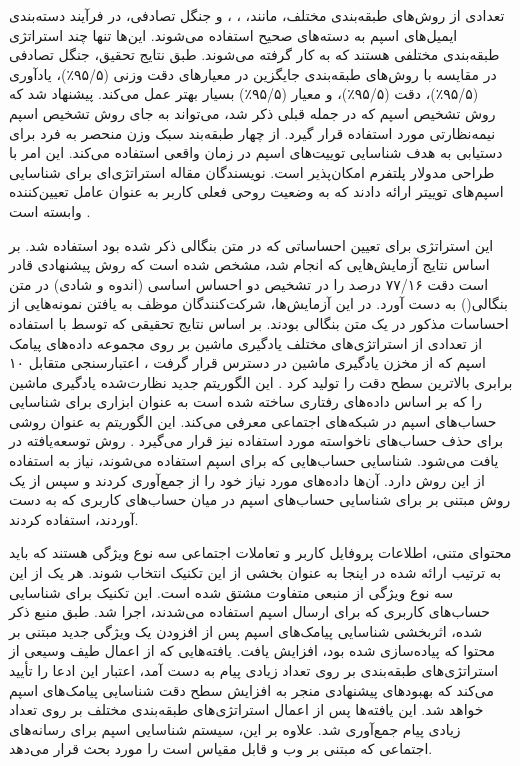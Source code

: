 \documentclass{CSICC2020}
\begin{document}
	تعدادی از روش‌های طبقه‌بندی مختلف، مانند، ، ، و جنگل تصادفی، در فرآیند دسته‌بندی ایمیل‌های اسپم به دسته‌های صحیح استفاده می‌شوند. این‌ها تنها چند استراتژی طبقه‌بندی مختلفی هستند که به کار گرفته می‌شوند. طبق نتایج تحقیق، جنگل تصادفی در مقایسه با روش‌های طبقه‌بندی جایگزین در معیارهای دقت وزنی (۹۵/۵٪)، یادآوری (۹۵/۵٪)، دقت (۹۵/۵٪)، و معیار (۹۵/۵٪) بسیار بهتر عمل می‌کند. پیشنهاد شد که روش تشخیص اسپم  که در جمله قبلی ذکر شد، می‌تواند به جای روش تشخیص اسپم نیمه‌نظارتی مورد استفاده قرار گیرد.  از چهار طبقه‌بند سبک وزن منحصر به فرد برای دستیابی به هدف شناسایی توییت‌های اسپم در زمان واقعی استفاده می‌کند. این امر با طراحی مدولار پلتفرم امکان‌پذیر است. نویسندگان مقاله استراتژی‌ای برای شناسایی اسپم‌های توییتر ارائه دادند که به وضعیت روحی فعلی کاربر به عنوان عامل تعیین‌کننده وابسته است \cite{islam2019using}.
	
	این استراتژی برای تعیین احساساتی که در متن بنگالی ذکر شده بود استفاده شد. بر اساس نتایج آزمایش‌هایی که انجام شد، مشخص شده است که روش پیشنهادی قادر است دقت ۷۷/۱۶ درصد را در تشخیص دو احساس اساسی (اندوه و شادی) در متن بنگالی() به دست آورد. در این آزمایش‌ها، شرکت‌کنندگان موظف به یافتن نمونه‌هایی از احساسات مذکور در یک متن بنگالی بودند. بر اساس نتایج تحقیقی که توسط با استفاده از تعدادی از استراتژی‌های مختلف یادگیری ماشین بر روی مجموعه داده‌های پیامک اسپم که از مخزن یادگیری ماشین  در دسترس قرار گرفت \cite{sayamber2014malicious}، اعتبارسنجی متقابل ۱۰ برابری بالاترین سطح دقت را تولید کرد \cite{sayamber2014malicious}. این الگوریتم جدید نظارت‌شده یادگیری ماشین را که بر اساس داده‌های رفتاری ساخته شده است به عنوان ابزاری برای شناسایی حساب‌های اسپم در شبکه‌های اجتماعی معرفی می‌کند. این الگوریتم به عنوان روشی برای حذف حساب‌های ناخواسته مورد استفاده نیز قرار می‌گیرد \cite{rajalakshmi2019transfer}. روش توسعه‌یافته در \cite{jian2016design} یافت می‌شود. شناسایی حساب‌هایی که برای اسپم استفاده می‌شوند، نیاز به استفاده از این روش دارد. آن‌ها داده‌های مورد نیاز خود را از  جمع‌آوری کردند و سپس از یک روش مبتنی بر  برای شناسایی حساب‌های اسپم در میان حساب‌های کاربری که به دست آوردند، استفاده کردند.
	
	محتوای متنی، اطلاعات پروفایل کاربر و تعاملات اجتماعی سه نوع ویژگی هستند که باید به ترتیب ارائه شده در اینجا به عنوان بخشی از این تکنیک انتخاب شوند. هر یک از این سه نوع ویژگی از منبعی متفاوت مشتق شده است. این تکنیک برای شناسایی حساب‌های کاربری که برای ارسال اسپم استفاده می‌شدند، اجرا شد. طبق منبع ذکر شده، اثربخشی شناسایی پیامک‌های اسپم پس از افزودن یک ویژگی جدید مبتنی بر محتوا که پیاده‌سازی شده بود، افزایش یافت. یافته‌هایی که از اعمال طیف وسیعی از استراتژی‌های طبقه‌بندی بر روی تعداد زیادی پیام به دست آمد، اعتبار این ادعا را تأیید می‌کند که بهبودهای پیشنهادی منجر به افزایش سطح دقت شناسایی پیامک‌های اسپم خواهد شد. این یافته‌ها پس از اعمال استراتژی‌های طبقه‌بندی مختلف بر روی تعداد زیادی پیام جمع‌آوری شد. علاوه بر این، \cite{alzubaidi_detect} سیستم شناسایی اسپم برای رسانه‌های اجتماعی که مبتنی بر وب و قابل مقیاس است را مورد بحث قرار می‌دهد.
	
\end{document}
